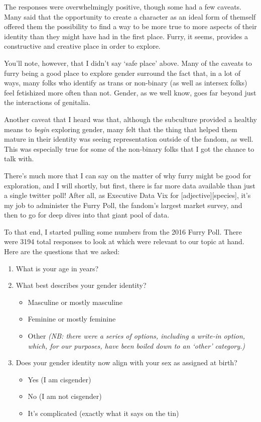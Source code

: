 The responses were overwhelmingly positive, though some had a few caveats.  Many said that the opportunity to create a character as an ideal form of themself offered them the possibility to find a way to be more true to more aspects of their identity than they might have had in the first place.  Furry, it seems, provides a constructive and creative place in order to explore.

You'll note, however, that I didn't say `safe place' above.  Many of the caveats to furry being a good place to explore gender surround the fact that, in a lot of ways, many folks who identify as trans or non-binary (as well as intersex folks) feel fetishized more often than not.  Gender, as we well know, goes far beyond just the interactions of genitalia.

Another caveat that I heard was that, although the subculture provided a healthy means to \textit{begin} exploring gender, many felt that the thing that helped them mature in their identity was seeing representation outside of the fandom, as well.  This was especially true for some of the non-binary folks that I got the chance to talk with.

There's much more that I can say on the matter of why furry might be good for exploration, and I will shortly, but first, there is far more data available than just a single twitter poll!  After all, as Executive Data Vix for [adjective][species], it's my job to administer the Furry Poll, the fandom's largest market survey, and then to go for deep dives into that giant pool of data.

To that end, I started pulling some numbers from the 2016 Furry Poll.  There were 3194 total responses to look at which were relevant to our topic at hand.  Here are the questions that we asked:

\begin{enumerate}
  \item What is your age in years?
  \item What best describes your gender identity?
  \begin{itemize}
    \item Masculine or mostly masculine
    \item Feminine or mostly feminine
    \item Other \textit{(NB: there were a series of options, including a write-in option, which, for our purposes, have been boiled down to an `other' category.)}
  \end{itemize}
  \item Does your gender identity now align with your sex as assigned at birth?
  \begin{itemize}
    \item Yes (I am cisgender)
    \item No (I am not cisgender)
    \item It's complicated (exactly what it says on the tin)
  \end{itemize}
\end{enumerate}

